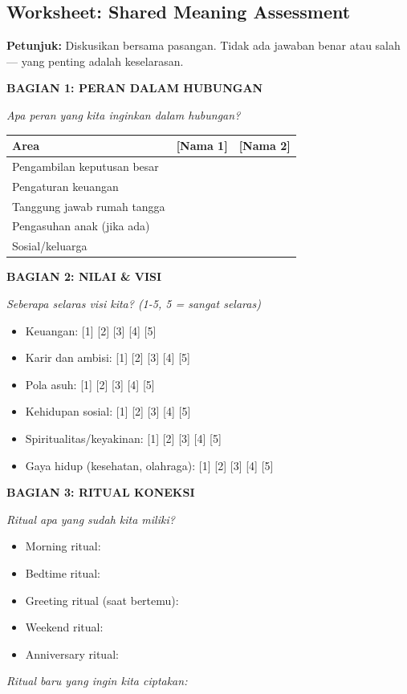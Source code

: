 \subsection{Worksheet: Shared Meaning Assessment}

\begin{exercisebox}
\textbf{Petunjuk:} Diskusikan bersama pasangan. Tidak ada jawaban benar atau salah --- yang penting adalah keselarasan.

\vspace{0.3cm}
\textbf{BAGIAN 1: PERAN DALAM HUBUNGAN}

\textit{Apa peran yang kita inginkan dalam hubungan?}
\begin{center}
\renewcommand{\arraystretch}{1.3}
\begin{tabular}{|p{4cm}|p{4cm}|p{5cm}|}
\hline
\rowcolor{primary!15}
\textbf{Area} & \textbf{[Nama 1]} & \textbf{[Nama 2]} \\
\hline
Pengambilan keputusan besar & & \\
\hline
Pengaturan keuangan & & \\
\hline
Tanggung jawab rumah tangga & & \\
\hline
Pengasuhan anak (jika ada) & & \\
\hline
Sosial/keluarga & & \\
\hline
\end{tabular}
\end{center}

\textbf{BAGIAN 2: NILAI \& VISI}

\textit{Seberapa selaras visi kita? (1-5, 5 = sangat selaras)}

\begin{itemize}[itemsep=0.2cm]
    \item[$\square$] Keuangan: [1] [2] [3] [4] [5]
    \item[$\square$] Karir dan ambisi: [1] [2] [3] [4] [5]
    \item[$\square$] Pola asuh: [1] [2] [3] [4] [5]
    \item[$\square$] Kehidupan sosial: [1] [2] [3] [4] [5]
    \item[$\square$] Spiritualitas/keyakinan: [1] [2] [3] [4] [5]
    \item[$\square$] Gaya hidup (kesehatan, olahraga): [1] [2] [3] [4] [5]
\end{itemize}

\textbf{BAGIAN 3: RITUAL KONEKSI}

\textit{Ritual apa yang sudah kita miliki?}
\begin{itemize}[itemsep=0.15cm]
    \item[$\square$] Morning ritual: \hrulefill
    \item[$\square$] Bedtime ritual: \hrulefill
    \item[$\square$] Greeting ritual (saat bertemu): \hrulefill
    \item[$\square$] Weekend ritual: \hrulefill
    \item[$\square$] Anniversary ritual: \hrulefill
\end{itemize}

\textit{Ritual baru yang ingin kita ciptakan:} \hrulefill
\end{exercisebox}

